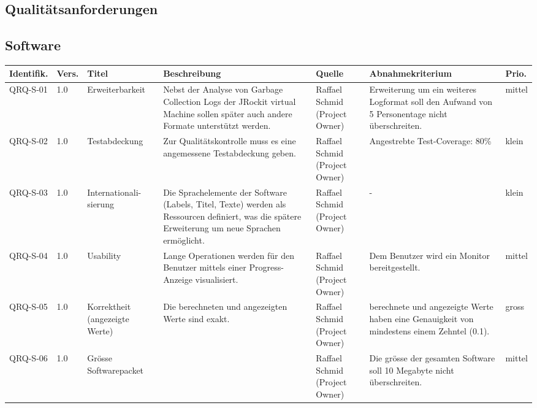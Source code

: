 \begin{landscape}
\section{Qualitätsanforderungen}
\subsection{Software}\label{anforderungen_software}
\begin{longtable}{|p{1.6cm}|p{0.7cm}|p{2.5cm}|p{4.5cm}|p{2.6cm}|p{4cm}|p{0.9cm}|}
    \hline
    \textbf{Identifik.} & \textbf{Vers.}& \textbf{Titel} & \textbf{Beschreibung} & \textbf{Quelle} & \textbf{Abnahmekriterium} & \textbf{Prio.}\\\hline
   QRQ-S-01 & 1.0 & Erweiterbarkeit & Nebst der Analyse von Garbage Collection Logs der JRockit virtual Machine sollen später auch andere Formate unterstützt werden. & Raffael Schmid (Project Owner) & Erweiterung um ein weiteres Logformat soll den Aufwand von 5 Personentage nicht überschreiten. & mittel \\\hline
   QRQ-S-02 & 1.0 & Testabdeckung & Zur Qualitätskontrolle muss es eine angemessene Testabdeckung geben. & Raffael Schmid (Project Owner) & Angestrebte Test-Coverage: 80\% & klein \\\hline

  QRQ-S-03 & 1.0 & Internationali-sierung & Die Sprachelemente der Software (Labels, Titel, Texte) werden als Ressourcen definiert, was die spätere Erweiterung um neue Sprachen ermöglicht. & Raffael Schmid (Project Owner) & - & klein\\\hline

   QRQ-S-04 & 1.0 & Usability &Lange Operationen werden für den Benutzer mittels einer Progress-Anzeige visualisiert. & Raffael Schmid (Project Owner) & Dem Benutzer wird ein Monitor bereitgestellt.&mittel \\\hline

  QRQ-S-05 & 1.0 & Korrektheit (angezeigte Werte) & Die berechneten und angezeigten Werte sind exakt. & Raffael Schmid (Project Owner) & berechnete und angezeigte Werte haben eine Genauigkeit von mindestens einem Zehntel (0.1). & gross\\\hline
  
QRQ-S-06 & 1.0 & Grösse Softwarepacket & & Raffael Schmid (Project Owner) & Die grösse der gesamten Software soll 10 Megabyte nicht überschreiten. & mittel\\\hline


\end{longtable}
\end{landscape}
